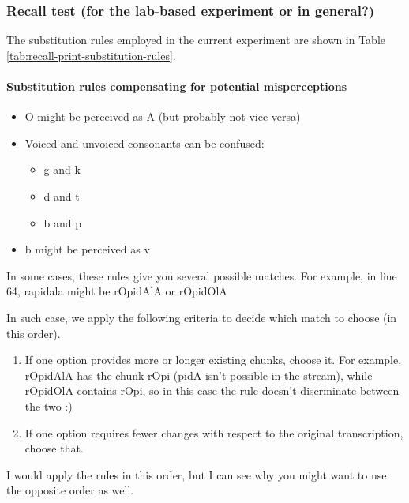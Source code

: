 \documentclass[]{article}
\providecommand{\tightlist}{%
  \setlength{\itemsep}{0pt}\setlength{\parskip}{0pt}}
\let\oldparagraph\paragraph
\renewcommand{\paragraph}[1]{\oldparagraph{#1}\mbox{}}
\begin{document}
\subsubsection{Recall test (for the lab-based experiment or in
general?)}\label{recall-test-for-the-lab-based-experiment-or-in-general}

The substitution rules employed in the current experiment are shown in
Table \ref{tab:recall-print-substitution-rules}.

\paragraph{Substitution rules compensating for potential
misperceptions}\label{substitution-rules-compensating-for-potential-misperceptions}

\begin{itemize}
\tightlist
\item
  O might be perceived as A (but probably not vice versa)
\item
  Voiced and unvoiced consonants can be confused:

  \begin{itemize}
  \tightlist
  \item
    g and k
  \item
    d and t
  \item
    b and p
  \end{itemize}
\item
  b might be perceived as v
\end{itemize}

In some cases, these rules give you several possible matches. For
example, in line 64, rapidala might be rOpidAlA or rOpidOlA

In such case, we apply the following criteria to decide which match to
choose (in this order).

\begin{enumerate}
\def\labelenumi{\arabic{enumi}.}
\item
  If one option provides more or longer existing chunks, choose it. For
  example, rOpidAlA has the chunk rOpi (pidA isn't possible in the
  stream), while rOpidOlA contains rOpi, so in this case the rule
  doesn't discrminate between the two :)
\item
  If one option requires fewer changes with respect to the original
  transcription, choose that.
\end{enumerate}

I would apply the rules in this order, but I can see why you might want
to use the opposite order as well.
\end{document}
